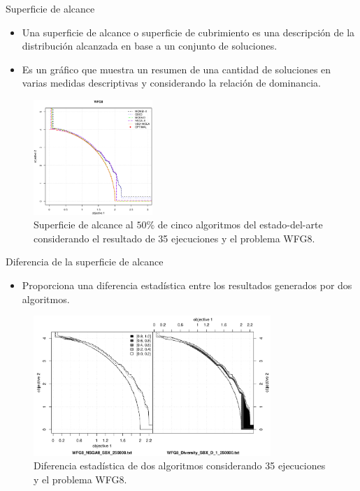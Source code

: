 \documentclass{beamer}
\begin{document}
\begin{frame}{Superficie de alcance}
\begin{itemize}
\item Una superficie de alcance o superficie de cubrimiento es una descripción de la distribución alcanzada en base a un conjunto de soluciones.
\item Es un gráfico que muestra un resumen de una cantidad de soluciones en varias medidas descriptivas y considerando la relación de dominancia.
\end{itemize}
\begin{figure}[H]
\includegraphics[width=0.4\textwidth]{Images/superficie_alcance_WFG8.eps}
\centering
\caption{\scriptsize Superficie de alcance al $50\%$ de cinco algoritmos del estado-del-arte considerando el resultado de 35 ejecuciones y el problema WFG8.}
\end{figure}
\end{frame}


\begin{frame}{Diferencia de la superficie de alcance}
\begin{itemize}
\item Proporciona una diferencia estadística entre los resultados generados por dos algoritmos.
\end{itemize}
\begin{figure}[H]
 \includegraphics[width=0.8\textwidth]{Images/diff_plot.png} 
\centering
\caption{\scriptsize Diferencia estadística de dos algoritmos considerando 35 ejecuciones y el problema WFG8.}
\end{figure}

\end{frame}
\end{document}
